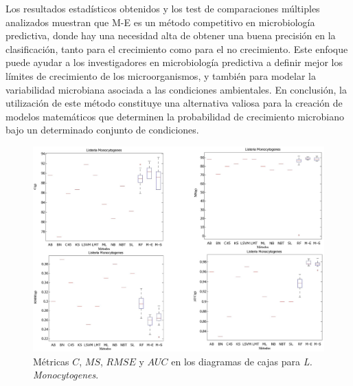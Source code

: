 Los resultados estadísticos obtenidos y los test de comparaciones múltiples analizados muestran que
M-E es un método competitivo en microbiología predictiva, donde hay
una
necesidad alta de obtener una buena precisión en la clasificación, tanto para el crecimiento como
para el no
crecimiento. Este enfoque puede ayudar a los investigadores en microbiología predictiva
a definir mejor los límites de crecimiento de los microorganismos, y también para modelar la
variabilidad microbiana asociada a las condiciones ambientales. En conclusión, la utilización de
este método
constituye una alternativa valiosa para la creación de modelos matemáticos que determinen la
probabilidad de crecimiento microbiano bajo un determinado conjunto de condiciones.

\begin{landscape}
\begin{figure}[!htb]
\centering
	\includegraphics[keepaspectratio,width=17cm]{figuras/BoxPlot_tanda1.jpg}
	\caption{Métricas $C$, $MS$, $RMSE$ y $AUC$ en los diagramas de cajas para
\textit{L. Monocytogenes}.}
	\label{fig1aplica}
\end{figure}
\end{landscape}

